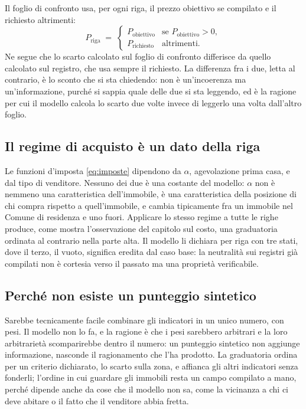 \documentclass[11pt,a4paper]{article}
\theoremstyle{definition}
\theoremstyle{plain}
\begin{document}
Il foglio di confronto usa, per ogni riga, il prezzo obiettivo se compilato e il richiesto altrimenti:
\begin{equation}
P_{\text{riga}} \;=\; \begin{cases} P_{\text{obiettivo}} & \text{se } P_{\text{obiettivo}}>0,\\ P_{\text{richiesto}} & \text{altrimenti.}\end{cases}
\label{eq:prezzo-riga}
\end{equation}
Ne segue che lo scarto calcolato sul foglio di confronto differisce da quello calcolato sul registro, che usa sempre il richiesto. La differenza fra i due, letta al contrario, è lo sconto che si sta chiedendo: non è un'incoerenza ma un'informazione, purché si sappia quale delle due si sta leggendo, ed è la ragione per cui il modello calcola lo scarto due volte invece di leggerlo una volta dall'altro foglio.

\subsection{Il regime di acquisto è un dato della riga}

Le funzioni d'imposta \eqref{eq:imposte} dipendono da $\alpha$, agevolazione prima casa, e dal tipo di venditore. Nessuno dei due è una costante del modello: $\alpha$ non è nemmeno una caratteristica dell'immobile, è una caratteristica della posizione di chi compra rispetto a quell'immobile, e cambia tipicamente fra un immobile nel Comune di residenza e uno fuori. Applicare lo stesso regime a tutte le righe produce, come mostra l'osservazione del capitolo sul costo, una graduatoria ordinata al contrario nella parte alta. Il modello li dichiara per riga con tre stati, dove il terzo, il vuoto, significa eredita dal caso base: la neutralità sui registri già compilati non è cortesia verso il passato ma una proprietà verificabile.

\subsection{Perché non esiste un punteggio sintetico}

Sarebbe tecnicamente facile combinare gli indicatori in un unico numero, con pesi. Il modello non lo fa, e la ragione è che i pesi sarebbero arbitrari e la loro arbitrarietà scomparirebbe dentro il numero: un punteggio sintetico non aggiunge informazione, nasconde il ragionamento che l'ha prodotto. La graduatoria ordina per un criterio dichiarato, lo scarto sulla zona, e affianca gli altri indicatori senza fonderli; l'ordine in cui guardare gli immobili resta un campo compilato a mano, perché dipende anche da cose che il modello non sa, come la vicinanza a chi ci deve abitare o il fatto che il venditore abbia fretta.
\end{document}
